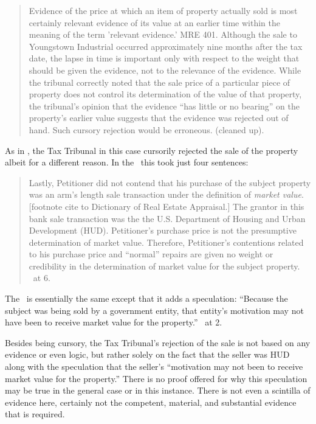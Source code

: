 \documentclass[12pt,\documentclassflag]{michiganCourtOfAppealsBrief}
\begin{document}
\begin{quote}
Evidence of the price at which an item of property actually sold is most certainly relevant evidence of its value at an earlier time within the meaning of the term 'relevant evidence.' MRE 401. Although the sale to Youngstown Industrial occurred approximately nine months after the tax date, the lapse in time is important only with respect to the weight that should be given the evidence, not to the relevance of the evidence. While the tribunal correctly noted that the sale price of a particular piece of property does not control its determination of the value of that property, the tribunal's opinion that the evidence ``has little or no bearing'' on the property's earlier value suggests that the evidence was rejected out of hand. Such cursory rejection would be erroneous.  (cleaned up).
\end{quote} 

As in \cite[s]{Jones & Laughlin}, the Tax Tribunal in this case cursorily rejected the sale of the property albeit for a different reason. In the \FOJ\ this took just four sentences: 

\begin{quote}
	Lastly, Petitioner did not contend that his purchase of the subject property was an arm's length sale transaction under the definition of \textit{market value}. [footnote cite to Dictionary of Real Estate Appraisal.] The grantor in this bank sale transaction was the the U.S. Department of Housing and Urban Development (HUD). Petitioner's purchase price is not the presumptive determination of market value. Therefore, Petitioner's contentions related to his purchase price and ``normal'' repairs are given no weight or credibility in the determination of market value for the subject property. \FOJ\ at 6.
\end{quote}

The \orderDenying\ is essentially the same except that it adds a speculation: ``Because the subject was being sold by a government entity, that entity's motivation may not have been to receive market value for the property.'' \orderDenying\ at 2.

Besides being cursory, the Tax Tribunal's rejection of the sale is not based on any evidence or even logic, but rather solely on the fact that the seller was HUD along with the speculation that the seller's ``motivation may not been to receive market value for the property.'' There is no proof offered for why this speculation may be true in the general case or in this instance. There is not even a scintilla of evidence here, certainly not the competent, material, and substantial evidence that is required.
\end{document}
